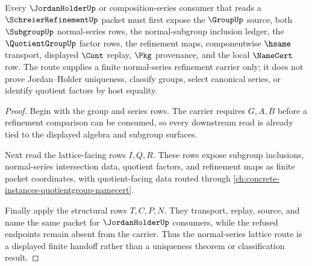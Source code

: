 \begin{theorem}
\label{thm:schreier-refinement-normal-series-lattice-route}
Every $\JordanHolderUp$ or composition-series consumer that reads a $\SchreierRefinementUp$ packet must first expose the $\GroupUp$ source, both $\SubgroupUp$ normal-series rows, the normal-subgroup inclusion ledger, the $\QuotientGroupUp$ factor rows, the refinement maps, componentwise $\hsame$ transport, displayed $\Cont$ replay, $\Pkg$ provenance, and the local $\NameCert$ row. The route supplies a finite normal-series refinement carrier only; it does not prove Jordan--Holder uniqueness, classify groups, select canonical series, or identify quotient factors by host equality.
\end{theorem}
\begin{proof}
Begin with the group and series rows. The carrier requires $G,A,B$ before a refinement comparison can be consumed, so every downstream read is already tied to the displayed algebra and subgroup surfaces.

Next read the lattice-facing rows $I,Q,R$. These rows expose subgroup inclusions, normal-series intersection data, quotient factors, and refinement maps as finite packet coordinates, with quotient-facing data routed through \autoref{ch:concrete-instances-quotientgroup-namecert}.

Finally apply the structural rows $T,C,P,N$. They transport, replay, source, and name the same packet for $\JordanHolderUp$ consumers, while the refused endpoints remain absent from the carrier. Thus the normal-series lattice route is a displayed finite handoff rather than a uniqueness theorem or classification result.
\end{proof}




